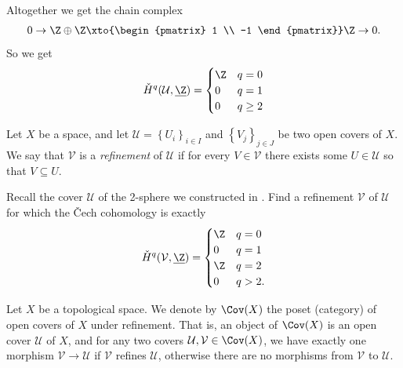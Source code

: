 \documentclass[11pt]{book}
\begin{document}
\begin{example}
\begin{align*}
\end{align*}
Altogether we get the chain complex
\begin{align*}
    0 \to \Z \oplus \Z \xto{\begin{pmatrix} 1 \\ -1 \end{pmatrix}} \Z \to 0.
\end{align*}
So we get
\begin{align*}
    \check{H}^q(\mathcal{U},\underline{\Z}) = \begin{cases} \Z & q=0 \\ 0 & q=1 \\ 0 & q\ge 2 \end{cases}
\end{align*}
\end{example}

\begin{definition}\label{def:refinement-open-cover} Let $X$ be a space, and let $\mathcal{U} = \left\{ U_i \right\}_{i\in I}$ and $\left\{ V_j \right\}_{j\in J}$ be two open covers of $X$. We say that $\mathcal{V}$ is a \emph{refinement} of $\mathcal{U}$ if for every $V\in \mathcal{V}$ there exists some $U \in \mathcal{U}$ so that $V \subseteq U$.
\end{definition}

\begin{exercise} Recall the cover $\mathcal{U}$ of the 2-sphere we constructed in . Find a refinement $\mathcal{V}$ of $\mathcal{U}$ for which the \v{C}ech cohomology is exactly
\begin{align*}
    \check{H}^q(\mathcal{V},\underline{\Z}) = \begin{cases} \Z & q=0 \\ 0 & q=1 \\ \Z & q=2 \\ 0 & q>2. \end{cases}
\end{align*}
\end{exercise}

\begin{definition}\label{def:covX} Let $X$ be a topological space. We denote by $\Cov(X)$ the poset (category) of open covers of $X$ under refinement. That is, an object of $\Cov(X)$ is an open cover $\mathcal{U}$ of $X$, and for any two covers $\mathcal{U},\mathcal{V} \in \Cov(X)$, we have exactly one morphism $\mathcal{V} \to \mathcal{U}$ if $\mathcal{V}$ refines $\mathcal{U}$, otherwise there are no morphisms from $\mathcal{V}$ to $\mathcal{U}$.
\end{definition}
\end{document}
